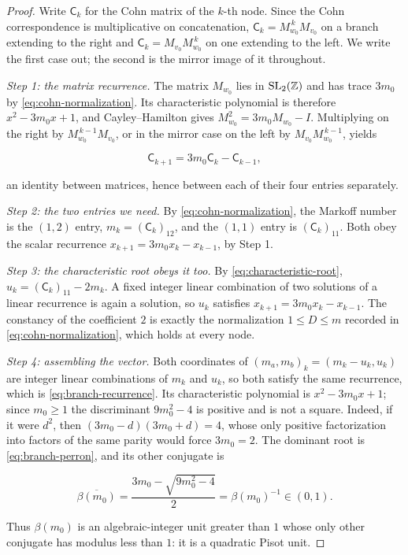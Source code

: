 \begin{proof}
Write $\mathsf C_k$ for the Cohn matrix of the $k$-th node. Since the Cohn
correspondence is multiplicative on concatenation,
$\mathsf C_k=M_{w_0}^{\,k}M_{v_0}$ on a branch extending to the right and
$\mathsf C_k=M_{v_0}M_{w_0}^{\,k}$ on one extending to the left. We write the
first case out; the second is the mirror image of it throughout.

\emph{Step 1: the matrix recurrence.} The matrix $M_{w_0}$ lies in
$\mathrm{SL}_2(\mathbb{Z})$ and has trace $3m_0$ by
\cref{eq:cohn-normalization}. Its characteristic polynomial is therefore
$x^2-3m_0x+1$, and Cayley--Hamilton gives
$M_{w_0}^2=3m_0M_{w_0}-I$. Multiplying on the right by
$M_{w_0}^{\,k-1}M_{v_0}$, or in the mirror case on the left by
$M_{v_0}M_{w_0}^{\,k-1}$, yields

\begin{equation}
 \mathsf C_{k+1}=3m_0\mathsf C_k-\mathsf C_{k-1},
 \label{eq:matrix-recurrence}
\end{equation}

an identity between matrices, hence between each of their four entries
separately.

\emph{Step 2: the two entries we need.} By \cref{eq:cohn-normalization}, the
Markoff number is the $(1,2)$ entry, $m_k=(\mathsf C_k)_{12}$, and the $(1,1)$ entry
is $(\mathsf C_k)_{11}$. Both obey the scalar recurrence
$x_{k+1}=3m_0x_k-x_{k-1}$, by Step 1.

\emph{Step 3: the characteristic root obeys it too.} By
\cref{eq:characteristic-root}, $u_k=(\mathsf C_k)_{11}-2m_k$. A fixed integer linear
combination of two solutions of a linear recurrence is again a solution, so
$u_k$ satisfies $x_{k+1}=3m_0x_k-x_{k-1}$. The constancy of the coefficient
$2$ is exactly the normalization $1\leqslant D\leqslant m$ recorded in
\cref{eq:cohn-normalization}, which holds at every node.

\emph{Step 4: assembling the vector.} Both coordinates of
$(m_a,m_b)_k=(m_k-u_k,u_k)$ are integer linear combinations of $m_k$ and
$u_k$, so both satisfy the same recurrence, which is
\cref{eq:branch-recurrence}. Its characteristic polynomial is
$x^2-3m_0x+1$; since $m_0\geqslant1$ the discriminant $9m_0^2-4$ is positive
and is not a square. Indeed, if it were $d^2$, then
$(3m_0-d)(3m_0+d)=4$, whose only positive factorization into factors of the
same parity would force $3m_0=2$. The dominant root is
\cref{eq:branch-perron}, and its other conjugate is

\begin{equation}
 \overline{\beta(m_0)}
 =\frac{3m_0-\sqrt{9m_0^2-4}}2
 =\beta(m_0)^{-1}\in(0,1).
 \label{eq:branch-pisot-conjugate}
\end{equation}

Thus $\beta(m_0)$ is an algebraic-integer unit greater than $1$ whose only
other conjugate has modulus less than $1$: it is a quadratic Pisot unit.
\end{proof}

